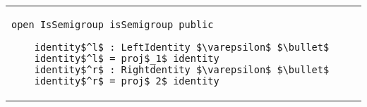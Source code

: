 \begin{adjustbox}{width=1.2\columnwidth,center}
\begin{tabular}{p{7cm} p{7cm} p{7cm}}
\begin{lstlisting}[mathescape]
    open IsSemigroup isSemigroup public 
     
    identity$^l$ : LeftIdentity $\varepsilon$ $\bullet$ 
    identity$^l$ = proj$_1$ identity 
    identity$^r$ : Rightdentity $\varepsilon$ $\bullet$ 
    identity$^r$ = proj$_2$ identity           
\end{lstlisting}    
\end{tabular}  
\end{adjustbox}

